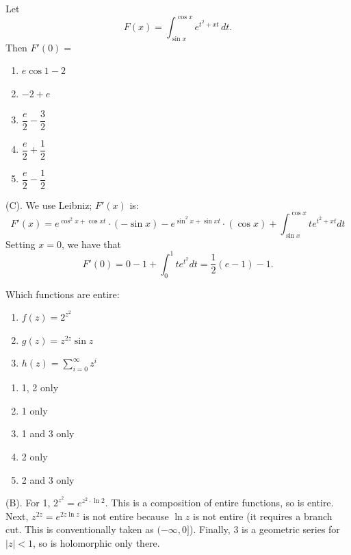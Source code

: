 \begin{exercise}
Let
\[
F(x)=\int_{\sin x}^{\cos x} e^{t^2+xt}\,dt.
\]
Then $F'(0)=$

\begin{enumerate}[label=(\Alph*)]
    \item $e\cos 1-2$
    \item $-2+e$
    \item $\dfrac{e}{2}-\dfrac{3}{2}$
    \item $\dfrac{e}{2}+\dfrac{1}{2}$
    \item $\dfrac{e}{2}-\dfrac{1}{2}$
\end{enumerate}
\end{exercise}
\begin{solution}
(C). We use Leibniz; $F'(x)$ is:
\[
F'(x) = e^{\cos^2x + \cos x t}\cdot (-\sin x) - e^{\sin^2x + \sin x t} \cdot ( \cos x) + 
\int_{\sin x}^{\cos x} te^{t^2+xt} dt
\]
Setting $x = 0$, we have that
\[
F'(0) = 0 - 1 + \int_0^1 te^{t^2} dt 
= \frac{1}{2}(e - 1) - 1.
\]
\end{solution}

\begin{exercise}
Which functions are entire:
\begin{enumerate}
    \item $f(z)=2^{z^2}$
    \item $g(z)=z^{2z}\sin z$
    \item $h(z)=\displaystyle\sum_{i=0}^{\infty}z^i$
\end{enumerate}
\begin{enumerate}[label=(\Alph*)]
    \item 1, 2 only
    \item 1 only
    \item 1 and 3 only
    \item 2 only
    \item 2 and 3 only
\end{enumerate}
\end{exercise}
\begin{solution}
(B). For 1, $2^{z^2} = e^{z^2 \cdot \ln 2}$. This is a composition of entire functions, so 
is entire. Next, $z^{2z} = e^{2z \ln z}$ is not entire because $\ln z$ is not entire (it requires 
a branch cut. This is conventionally taken as $(-\infty, 0]$). Finally, 3 is a geometric series 
for $|z| < 1$, so is holomorphic only there. 
\end{solution}


